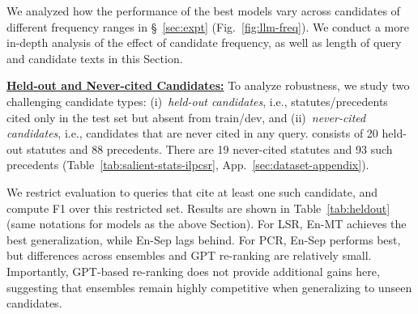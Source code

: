 

We analyzed how the performance of the best models vary across candidates of different frequency ranges in \S~\ref{sec:expt} (Fig.~\ref{fig:llm-freq}). We conduct a more in-depth analysis of the effect of candidate frequency, as well as length of query and candidate texts in this Section.

\vspace{1mm}
\noindent\underline{\bf Held-out and Never-cited Candidates:} \label{app:heldout}
To analyze robustness, we study two challenging candidate types:  
(i)~\textit{held-out candidates}, i.e., statutes/precedents cited only in the test set but absent from train/dev, and  
(ii)~\textit{never-cited candidates}, i.e., candidates that are never cited in any query. 
\ilpcsr{} consists of 20 held-out statutes and 88 precedents. There are 19 never-cited statutes and 93 such precedents (Table~\ref{tab:salient-stats-ilpcsr}, App.~\ref{sec:dataset-appendix}).

 We restrict evaluation to queries that cite at least one such candidate, and compute F1 over this restricted set. Results are shown in Table~\ref{tab:heldout} (same notations for models as the above Section). For LSR, En-MT achieves the best generalization, while En-Sep lags behind. For PCR, En-Sep performs best, but differences across ensembles and GPT re-ranking are relatively small. Importantly, GPT-based re-ranking does not provide additional gains here, suggesting that ensembles remain highly competitive when generalizing to unseen candidates.

